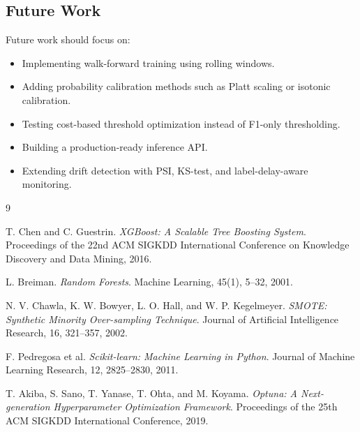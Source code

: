 \documentclass[12pt,a4paper,twoside]{article}
\begin{document}
\subsection{Future Work}

Future work should focus on:
\begin{itemize}
    \item Implementing walk-forward training using rolling windows.
    \item Adding probability calibration methods such as Platt scaling or isotonic calibration.
    \item Testing cost-based threshold optimization instead of F1-only thresholding.
    \item Building a production-ready inference API.
    \item Extending drift detection with PSI, KS-test, and label-delay-aware monitoring.
\end{itemize}

\clearpage
\begin{thebibliography}{9}

T. Chen and C. Guestrin.
\textit{XGBoost: A Scalable Tree Boosting System}.
Proceedings of the 22nd ACM SIGKDD International Conference on Knowledge Discovery and Data Mining, 2016.

L. Breiman.
\textit{Random Forests}.
Machine Learning, 45(1), 5--32, 2001.

N. V. Chawla, K. W. Bowyer, L. O. Hall, and W. P. Kegelmeyer.
\textit{SMOTE: Synthetic Minority Over-sampling Technique}.
Journal of Artificial Intelligence Research, 16, 321--357, 2002.

F. Pedregosa et al.
\textit{Scikit-learn: Machine Learning in Python}.
Journal of Machine Learning Research, 12, 2825--2830, 2011.

T. Akiba, S. Sano, T. Yanase, T. Ohta, and M. Koyama.
\textit{Optuna: A Next-generation Hyperparameter Optimization Framework}.
Proceedings of the 25th ACM SIGKDD International Conference, 2019.

\end{thebibliography}
\end{document}
